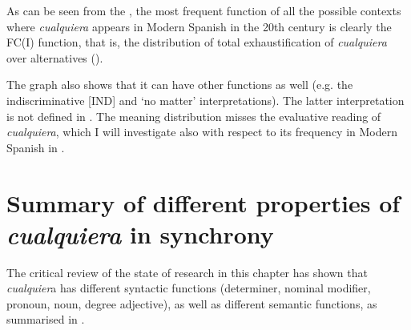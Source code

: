 As can be seen from the , the most frequent function of all the possible contexts where \textit{cualquiera} appears in Modern Spanish in the 20th century is clearly the FC(I) function, that is, the distribution of total exhaustification of \textit{cualquiera} over alternatives (). %



The graph also shows that it can have other functions as well (e.g. the indiscriminative [IND] and ‘no matter’ interpretations). The latter interpretation is not defined in . The meaning distribution misses the evaluative reading of \textit{cualquiera}, which I will investigate also with respect to its frequency in Modern Spanish in .

\section{{Summary} {of} {different} {properties} {of} {\textit{cualquiera}} {in} {synchrony}} \label{sec:2.5}

The critical review of the state of research in this chapter has shown that \textit{cualquier}a has different syntactic functions (determiner, nominal modifier, pronoun, noun, degree adjective), as well as different semantic functions, as summarised in .



